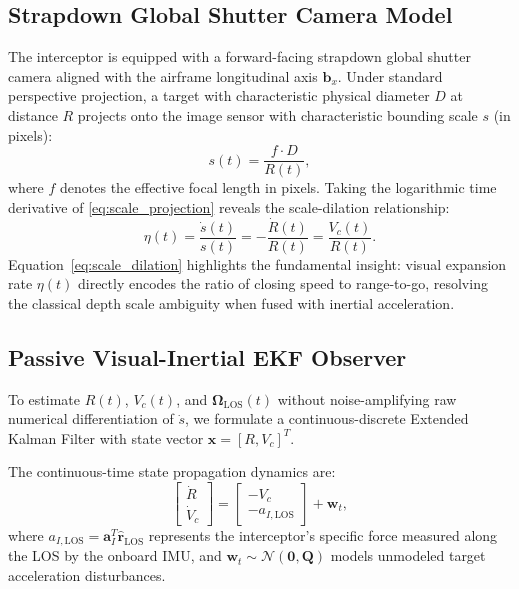 \documentclass[lettersize,journal]{IEEEtran}
\begin{document}
\subsection{Strapdown Global Shutter Camera Model}
The interceptor is equipped with a forward-facing strapdown global shutter camera aligned with the airframe longitudinal axis $\mathbf{b}_x$. Under standard perspective projection, a target with characteristic physical diameter $D$ at distance $R$ projects onto the image sensor with characteristic bounding scale $s$ (in pixels):
\begin{equation}
    s(t) = \frac{f \cdot D}{R(t)},
    \label{eq:scale_projection}
\end{equation}
where $f$ denotes the effective focal length in pixels. Taking the logarithmic time derivative of \eqref{eq:scale_projection} reveals the scale-dilation relationship:
\begin{equation}
    \eta(t) = \frac{\dot{s}(t)}{s(t)} = -\frac{\dot{R}(t)}{R(t)} = \frac{V_c(t)}{R(t)}.
    \label{eq:scale_dilation}
\end{equation}
Equation~\eqref{eq:scale_dilation} highlights the fundamental insight: visual expansion rate $\eta(t)$ directly encodes the ratio of closing speed to range-to-go, resolving the classical depth scale ambiguity when fused with inertial acceleration.

\subsection{Passive Visual-Inertial EKF Observer}
To estimate $R(t)$, $V_c(t)$, and $\mathbf{\Omega}_{\text{LOS}}(t)$ without noise-amplifying raw numerical differentiation of $\dot{s}$, we formulate a continuous-discrete Extended Kalman Filter with state vector $\mathbf{x} = [R, V_c]^T$.

The continuous-time state propagation dynamics are:
\begin{equation}
    \begin{bmatrix} \dot{R} \\ \dot{V}_c \end{bmatrix} = \begin{bmatrix} -V_c \\ -a_{I,\text{LOS}} \end{bmatrix} + \mathbf{w}_t,
\end{equation}
where $a_{I,\text{LOS}} = \mathbf{a}_I^T \hat{\mathbf{r}}_{\text{LOS}}$ represents the interceptor's specific force measured along the LOS by the onboard IMU, and $\mathbf{w}_t \sim \mathcal{N}(\mathbf{0}, \mathbf{Q})$ models unmodeled target acceleration disturbances.
\end{document}

